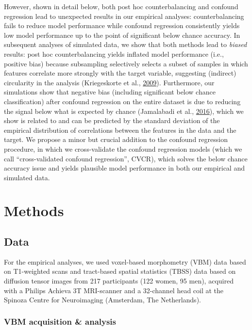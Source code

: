 \documentclass[12pt,american,a4paper,oneside,]{memoir} %
\begin{document}
However, shown in detail below, both post hoc counterbalancing and confound regression lead to unexpected results in our empirical analyses: counterbalancing fails to reduce model performance while confound regression consistently yields low model performance up to the point of significant below chance accuracy. In subsequent analyses of simulated data, we show that both methods lead to \emph{biased} results: post hoc counterbalancing yields inflated model performance (i.e., positive bias) because subsampling selectively selects a subset of samples in which features correlate more strongly with the target variable, suggesting (indirect) circularity in the analysis (Kriegeskorte et al., \protect\hyperlink{ref-kriegeskorte2009circular}{2009}). Furthermore, our simulations show that negative bias (including significant below chance classification) after confound regression on the entire dataset is due to reducing the signal below what is expected by chance (Jamalabadi et al., \protect\hyperlink{ref-Jamalabadi2016-gr}{2016}), which we show is related to and can be predicted by the standard deviation of the empirical distribution of correlations between the features in the data and the target. We propose a minor but crucial addition to the confound regression procedure, in which we cross-validate the confound regression models (which we call ``cross-validated confound regression'', CVCR), which solves the below chance accuracy issue and yields plausible model performance in both our empirical and simulated data.

\hypertarget{confounds-decoding-methods}{%
\section{Methods}\label{confounds-decoding-methods}}

\hypertarget{confounds-decoding-methods-data}{%
\subsection{Data}\label{confounds-decoding-methods-data}}

For the empirical analyses, we used voxel-based morphometry (VBM) data based on T1-weighted scans and tract-based spatial statistics (TBSS) data based on diffusion tensor images from 217 participants (122 women, 95 men), acquired with a Philips Achieva 3T MRI-scanner and a 32-channel head coil at the Spinoza Centre for Neuroimaging (Amsterdam, The Netherlands).

\hypertarget{confounds-decoding-methods-data-vbm}{%
\subsubsection{VBM acquisition \& analysis}\label{confounds-decoding-methods-data-vbm}}
\end{document}
